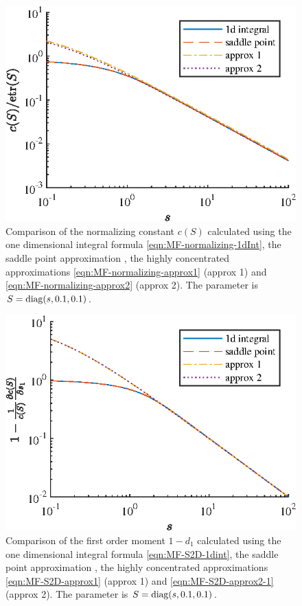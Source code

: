 \begin{figure}
	\centering
	\includegraphics[scale=1.4]{figures/MF-normal-approx2}
	\caption{Comparison of the normalizing constant $c(S)$ calculated using the one dimensional integral formula \eqref{eqn:MF-normalizing-1dInt}, the saddle point approximation \cite{kume2005saddlepoint}, the highly concentrated approximations \eqref{eqn:MF-normalizing-approx1} (approx 1) and \eqref{eqn:MF-normalizing-approx2} (approx 2).
	The parameter is $S = \mathrm{diag}(s,0.1,0.1)$.
	\label{fig:MF-nomral-approx2}}
\end{figure}

\begin{figure}
	\centering
	\includegraphics[scale=1.4]{figures/MF-S2D-approx2-1}
	\caption{Comparison of the first order moment $1-d_1$ calculated using the one dimensional integral formula \eqref{eqn:MF-S2D-1dint}, the saddle point approximation \cite{kume2005saddlepoint,kume2007derivatives}, the highly concentrated approximations \eqref{eqn:MF-S2D-approx1} (approx 1) and \eqref{eqn:MF-S2D-approx2-1} (approx 2).
	The parameter is $S = \mathrm{diag}(s,0.1,0.1)$.
	\label{fig:MF-S2D-approx2-1}}
\end{figure}


